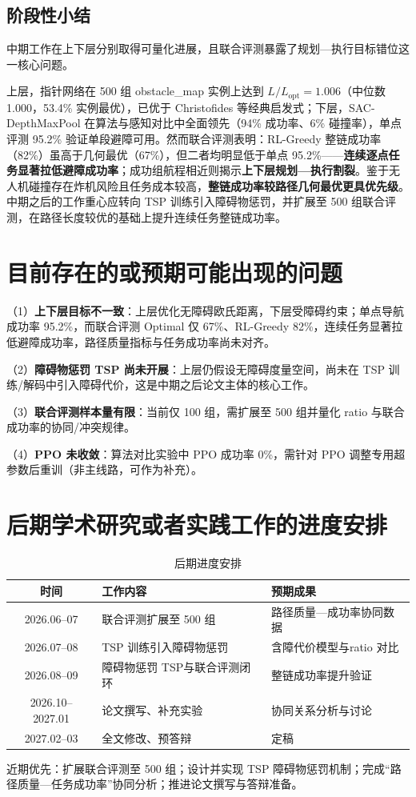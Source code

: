 \subsection{阶段性小结}

中期工作在上下层分别取得可量化进展，且联合评测暴露了规划—执行目标错位这一核心问题。

上层，指针网络在 500 组 obstacle\_map 实例上达到 $L/L_{\mathrm{opt}}=1.006$（中位数 1.000，53.4\% 实例最优），已优于 Christofides 等经典启发式；下层，SAC-DepthMaxPool 在算法与感知对比中全面领先（94\% 成功率、6\% 碰撞率），单点评测 95.2\% 验证单段避障可用。然而联合评测表明：RL-Greedy 整链成功率（82\%）虽高于几何最优（67\%），但二者均明显低于单点 95.2\%——\textbf{连续逐点任务显著拉低避障成功率}；成功组航程相近则揭示\textbf{上下层规划—执行割裂}。鉴于无人机碰撞存在炸机风险且任务成本较高，\textbf{整链成功率较路径几何最优更具优先级}。中期之后的工作重心应转向 TSP 训练引入障碍物惩罚，并扩展至 500 组联合评测，在路径长度较优的基础上提升连续任务整链成功率。

\section{目前存在的或预期可能出现的问题}

（1）\textbf{上下层目标不一致}：上层优化无障碍欧氏距离，下层受障碍约束；单点导航成功率 95.2\%，而联合评测 Optimal 仅 67\%、RL-Greedy 82\%，连续任务显著拉低避障成功率，路径质量指标与任务成功率尚未对齐。

（2）\textbf{障碍物惩罚 TSP 尚未开展}：上层仍假设无障碍度量空间，尚未在 TSP 训练/解码中引入障碍代价，这是中期之后论文主体的核心工作。

（3）\textbf{联合评测样本量有限}：当前仅 100 组，需扩展至 500 组并量化 ratio 与联合成功率的协同/冲突规律。

（4）\textbf{PPO 未收敛}：算法对比实验中 PPO 成功率 0\%，需针对 PPO 调整专用超参数后重训（非主线路，可作为补充）。

\section{后期学术研究或者实践工作的进度安排}

\begin{table}[htbp]
  \centering
  \caption{后期进度安排}
  \label{tab:schedule}
  \begin{tabular}{clp{5.2cm}}
    \toprule
    时间 & 工作内容 & 预期成果 \\
    \midrule
    2026.06--07 & 联合评测扩展至 500 组 & 路径质量—成功率协同数据 \\
    2026.07--08 & TSP 训练引入障碍物惩罚 & 含障代价模型与ratio 对比 \\
    2026.08--09 & 障碍物惩罚 TSP与联合评测闭环 & 整链成功率提升验证 \\
    2026.10--2027.01 & 论文撰写、补充实验 & 协同关系分析与讨论 \\
    2027.02--03 & 全文修改、预答辩 & 定稿 \\
    \bottomrule
  \end{tabular}
\end{table}

近期优先：扩展联合评测至 500 组；设计并实现 TSP 障碍物惩罚机制；完成``路径质量—任务成功率''协同分析；推进论文撰写与答辩准备。



